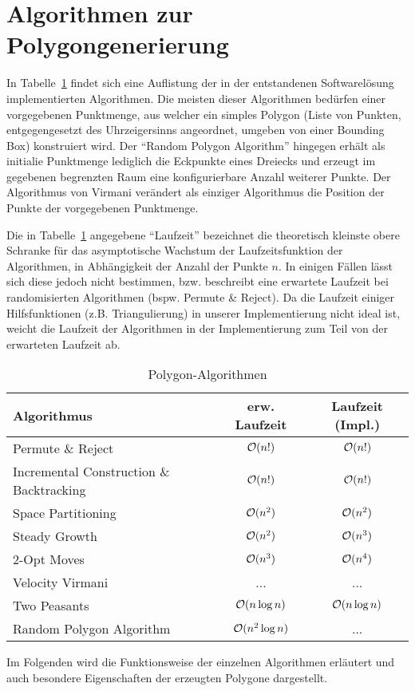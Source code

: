 \section{Algorithmen zur Polygongenerierung}

  In Tabelle~\ref{algo_table} findet sich eine Auflistung der in der
  entstandenen Softwarelösung implementierten Algorithmen. Die meisten dieser
  Algorithmen bedürfen einer vorgegebenen Punktmenge, aus welcher ein simples
  Polygon (Liste von Punkten, entgegengesetzt des Uhrzeigersinns angeordnet, 
  umgeben von einer Bounding Box) konstruiert wird. Der 
  \enquote{Random Polygon Algorithm} hingegen
  erhält als initialie Punktmenge lediglich die Eckpunkte eines Dreiecks und
  erzeugt im gegebenen begrenzten Raum eine konfigurierbare Anzahl weiterer
  Punkte. Der Algorithmus von Virmani verändert als einziger Algorithmus die
  Position der Punkte der vorgegebenen Punktmenge.

  Die in Tabelle~\ref{algo_table} angegebene \enquote{Laufzeit} bezeichnet die
  theoretisch kleinste obere Schranke für das asymptotische Wachstum der
  Laufzeitsfunktion der Algorithmen, in Abhängigkeit der Anzahl der Punkte $n$.
  In einigen Fällen lässt sich diese jedoch nicht bestimmen, bzw. beschreibt
  eine erwartete Laufzeit bei randomisierten Algorithmen (bspw. Permute \&
  Reject). Da die Laufzeit einiger Hilfsfunktionen (z.B. Triangulierung) in 
  unserer Implementierung nicht ideal ist, weicht die
  Laufzeit der Algorithmen in der Implementierung zum Teil von der erwarteten
  Laufzeit ab.

  \begin{table}[ht]
    \begin{center}
    \caption{Polygon-Algorithmen}
    \begin{tabular}{lcc} 
      \toprule
      Algorithmus & erw. Laufzeit & Laufzeit (Impl.) \\
      \midrule
      Permute \& Reject & $\mathcal{O}(n!)$ & $\mathcal{O}(n!)$ \\
      Incremental Construction \& Backtracking & $\mathcal{O}(n!)$ & $\mathcal{O}(n!)$ \\
      Space Partitioning & $\mathcal{O}(n^2)$ & $\mathcal{O}(n^2)$\\
      Steady Growth & $\mathcal{O}(n^2)$ & $\mathcal{O}(n^3)$ \\
      2-Opt Moves & $\mathcal{O}(n^3)$ & $\mathcal{O}(n^4)$ \\
      Velocity Virmani & ... & ...\\
      Two Peasants & $\mathcal{O}(n \log n)$ & $\mathcal{O}(n \log n)$ \\
      Random Polygon Algorithm & $\mathcal{O}(n^2 \log n)$ & ... \\
      \bottomrule
    \end{tabular}
    \label{algo_table}
    \end{center}
  \end{table}

  Im Folgenden wird die Funktionsweise der einzelnen Algorithmen erläutert und
  auch besondere Eigenschaften der erzeugten Polygone dargestellt.

